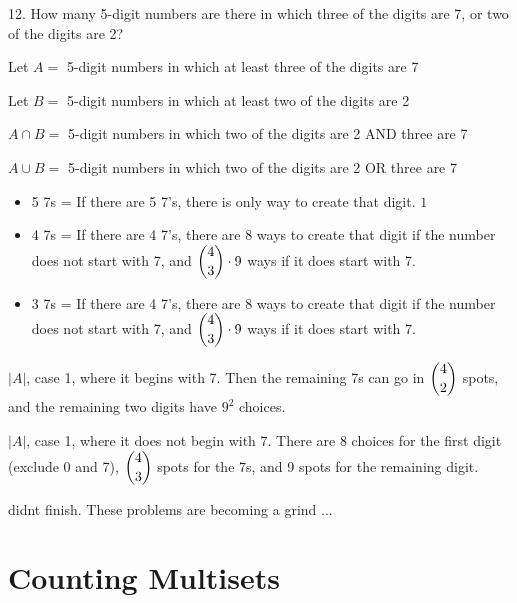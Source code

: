 \documentclass[openany, 12pt]{book}
\begin{document}
\begin{exercise}{}{}
	12. How many 5-digit numbers are there in which three of the
	digits are 7, or two of the digits are 2?
	\begin{alist}
		\item Let $A=$ 5-digit numbers in which at least three of the digits are 7
		\item Let $B=$ 5-digit numbers in which at least two of the digits are 2
		\item $A\cap B= $ 5-digit numbers in which two of the digits are 2 AND three are 7
		\item $A\cup B= $ 5-digit numbers in which two of the digits are 2 OR three are 7

		\begin{itemize}
			\item 5 7s = If there are 5 7's, there is only way to create that digit. $1$
			\item 4 7s = If there are 4 7's, there are 8 ways to create that digit if
			      the number does not start with 7, and $\dbinom{4}{3}\cdot9$ ways if it
			      does start with 7.
			\item 3 7s = If there are 4 7's, there are 8 ways to create that digit if
			      the number does not start with 7, and $\dbinom{4}{3}\cdot9$ ways if it
			      does start with 7.
		\end{itemize}

		\item $|A|$, case 1, where it begins with 7. Then the remaining 7s can go in
		$\dbinom{4}{2}$ spots, and the remaining two digits have $9^2$ choices.
		\item $|A|$, case 1, where it does not begin with 7. There are 8 choices for the
		first digit (exclude 0 and 7), $\dbinom{4}{3}$ spots for the 7s, and 9 spots
		for the remaining digit.

		\item didnt finish. These problems are becoming a grind ...
	\end{alist}
\end{exercise}


\section{Counting Multisets}
\end{document}
